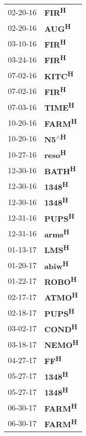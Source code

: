 \begin{supertabular}{p{0.08\textwidth}p{0.2\textwidth}}
 02-20-16 &            \textbf{FIR\textsuperscript{H}} \\
 02-20-16 &            \textbf{AUG\textsuperscript{H}} \\
 03-10-16 &            \textbf{FIR\textsuperscript{H}} \\
 03-24-16 &            \textbf{FIR\textsuperscript{H}} \\
 07-02-16 &           \textbf{KITC\textsuperscript{H}} \\
 07-02-16 &            \textbf{FIR\textsuperscript{H}} \\
 07-03-16 &           \textbf{TIME\textsuperscript{H}} \\
 10-20-16 &           \textbf{FARM\textsuperscript{H}} \\
 10-20-16 &     \textbf{N5\textsuperscript{$\wedge$H}} \\
 10-27-16 &           \textbf{reso\textsuperscript{H}} \\
 12-30-16 &           \textbf{BATH\textsuperscript{H}} \\
 12-30-16 &           \textbf{1348\textsuperscript{H}} \\
 12-30-16 &           \textbf{1348\textsuperscript{H}} \\
 12-31-16 &           \textbf{PUPS\textsuperscript{H}} \\
 12-31-16 &           \textbf{arms\textsuperscript{H}} \\
 01-13-17 &            \textbf{LMS\textsuperscript{H}} \\
 01-20-17 &           \textbf{abiw\textsuperscript{H}} \\
 01-22-17 &           \textbf{ROBO\textsuperscript{H}} \\
 02-17-17 &           \textbf{ATMO\textsuperscript{H}} \\
 02-18-17 &           \textbf{PUPS\textsuperscript{H}} \\
 03-02-17 &           \textbf{COND\textsuperscript{H}} \\
 03-18-17 &           \textbf{NEMO\textsuperscript{H}} \\
 04-27-17 &             \textbf{FF\textsuperscript{H}} \\
 05-27-17 &           \textbf{1348\textsuperscript{H}} \\
 05-27-17 &           \textbf{1348\textsuperscript{H}} \\
 06-30-17 &           \textbf{FARM\textsuperscript{H}} \\
 06-30-17 &           \textbf{FARM\textsuperscript{H}} \\

\end{supertabular}
